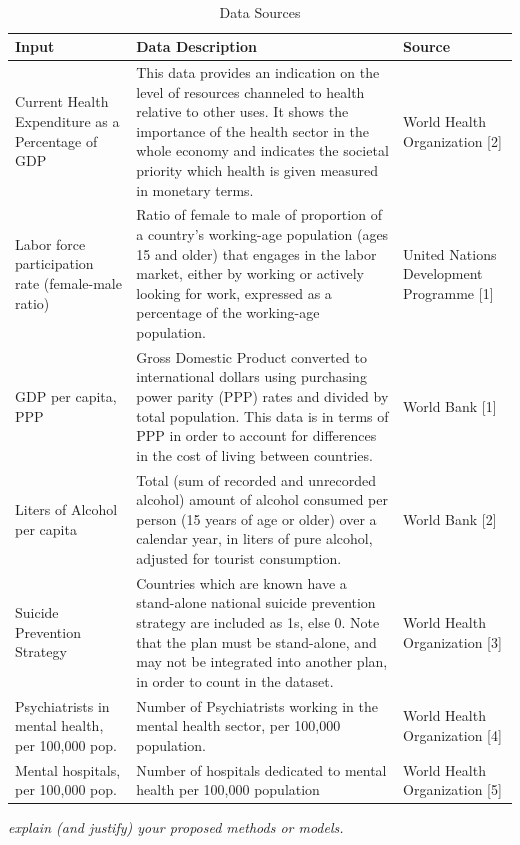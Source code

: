 \documentclass[]{article}
\begin{document}
\begin{table}[H]
\centering 
\caption{Data Sources}
\
\begin{tabular}{p{3cm}p{7cm}p{5cm}}  
\hline  
  Input & Data Description  & Source  \\   
\hline 
Current Health Expenditure as a Percentage of GDP & This data provides an indication on the level of resources channeled to health relative to other uses. It shows the importance of the health sector in the whole economy and indicates the societal priority which health is given measured in monetary terms. & World Health Organization [2]  \\   
 \hline 
Labor force participation rate (female-male ratio) & Ratio of female to male of proportion of a country’s working-age population (ages 15 and older) that engages in the labor market, either by working or actively looking for work, expressed as a percentage of the working-age population. & United Nations Development Programme [1] \\   
\hline 
GDP per capita, PPP & Gross Domestic Product converted to international dollars using purchasing power parity (PPP) rates and divided by total population. This data is in terms of PPP in order to account for differences in the cost of living between countries. & World Bank [1] \\
\hline 
Liters of Alcohol per capita &  Total (sum of recorded and unrecorded alcohol) amount of alcohol consumed per person (15 years of age or older) over a calendar year, in liters of pure alcohol, adjusted for tourist consumption. & World Bank [2] \\
\hline 
Suicide Prevention Strategy &  Countries which are known have a stand-alone national suicide prevention strategy are included as 1s, else 0. Note that the plan must be stand-alone, and may not be integrated into another plan, in order to count in the dataset. & World Health Organization [3] \\
\hline
Psychiatrists in mental health, per 100,000 pop. & Number of Psychiatrists working in the mental health sector, per 100,000 population.  & World Health Organization [4]  \\
\hline
Mental hospitals, per 100,000 pop. & Number of hospitals dedicated to mental health per 100,000 population & World Health Organization [5] \\
\hline
\end{tabular} 
\end{table}

\emph{explain (and justify) your proposed methods or models.}
\end{document}
